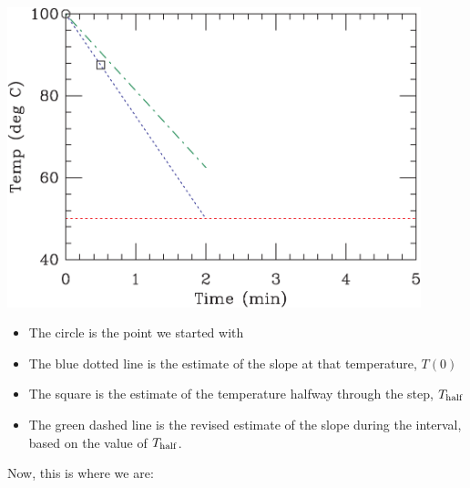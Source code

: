 \documentclass[12ampt]{article}
\begin{document}
\begin{minipage}{0.5\textwidth}
\includegraphics[width=0.9\textwidth]{rk0-crop.pdf}
\end{minipage}
\begin{minipage}{0.5\textwidth}
\begin{itemize}
\item The circle is the point we started with
\item The blue dotted line is the estimate of the slope at that temperature, $T(0)$
\item The square is the estimate of the temperature halfway through the step, $T_{\rm half}$
\item The green dashed line is the revised estimate of the slope during the 
interval, based on the value of $T_{\rm half}$.
\end{itemize}
\end{minipage}

Now, this is where we are:
\end{document}
